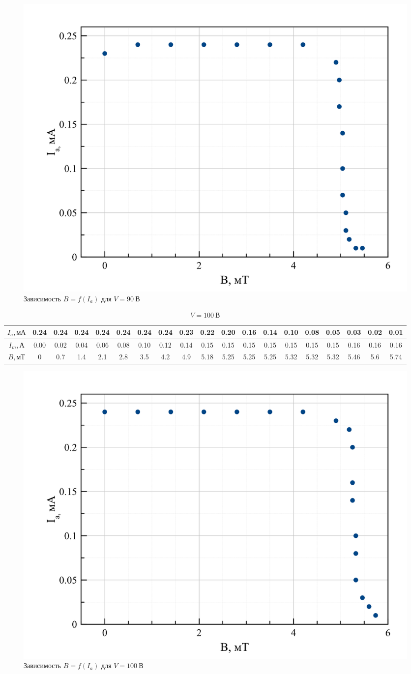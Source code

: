 \documentclass[a4paper, 12pt]{article}
\begin{document}
\begin{figure}[H]
\centering
	 \includegraphics[width = 0.6 \textwidth]{90V}
\caption{Зависимость $B = f(I_a)$ для $V = 90\: \text{В}$}
\end{figure}

\begin{table}[H]
\centering
\caption{$V = 100 \:\text{В}$}
 \begin{adjustbox}{max width=\textwidth}
\begin{tabular}{|c|c|c|c|c|c|c|c|c|c|c|c|c|c|c|c|c|c|c|}
\hline
$I_a, \text{мА}$ & 0.24 & 0.24 & 0.24 & 0.24 & 0.24 & 0.24 & 0.24 & 0.23 & 0.22 & 0.20 & 0.16 & 0.14 & 0.10 & 0.08 & 0.05 & 0.03 & 0.02 & 0.01 \\ \hline
$I_m, \text{А}$  &0.00 & 0.02 & 0.04 & 0.06 & 0.08 & 0.10 & 0.12 & 0.14 & 0.15 & 0.15 & 0.15 & 0.15 & 0.15 & 0.15 & 0.15 & 0.16 & 0.16 & 0.16 \\ \hline
$B,\text{мТ}$& 0    & 0.7  & 1.4  & 2.1  & 2.8  & 3.5  & 4.2  & 4.9  & 5.18 & 5.25 & 5.25 & 5.25 & 5.32 & 5.32 & 5.32 & 5.46 & 5.6  & 5.74 \\ \hline
\end{tabular}
\end{adjustbox}
\end{table}

\begin{figure}[H]
\centering
	 \includegraphics[width = 0.6 \textwidth]{100V}
\caption{Зависимость $B = f(I_a)$ для $V = 100\: \text{В}$}
\end{figure}
\end{document}

